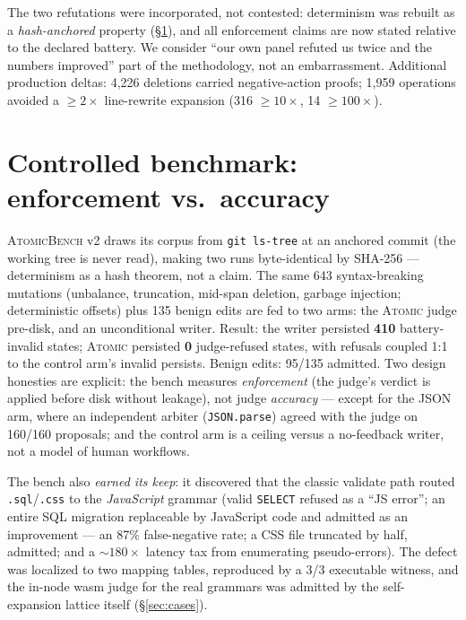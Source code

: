 The two refutations were incorporated, not contested: determinism was rebuilt as
a \emph{hash-anchored} property (\S\ref{sec:bench}), and all enforcement claims
are now stated relative to the declared battery. We consider
``our own panel refuted us twice and the numbers improved'' part of the
methodology, not an embarrassment. Additional production deltas: 4{,}226
deletions carried negative-action proofs; 1{,}959 operations avoided a
$\geq\!2\times$ line-rewrite expansion (316 $\geq\!10\times$, 14
$\geq\!100\times$).

\section{Controlled benchmark: enforcement vs.\ accuracy}\label{sec:bench}

\textsc{AtomicBench} v2 draws its corpus from \texttt{git ls-tree} at an anchored
commit (the working tree is never read), making two runs byte-identical by
SHA-256 --- determinism as a hash theorem, not a claim. The same 643
syntax-breaking mutations (unbalance, truncation, mid-span deletion, garbage
injection; deterministic offsets) plus 135 benign edits are fed to two arms: the
\textsc{Atomic} judge pre-disk, and an unconditional writer. Result: the writer
persisted \textbf{410} battery-invalid states; \textsc{Atomic} persisted
\textbf{0} judge-refused states, with refusals coupled 1:1 to the control arm's
invalid persists. Benign edits: 95/135 admitted. Two design honesties are
explicit: the bench measures \emph{enforcement} (the judge's verdict is applied
before disk without leakage), not judge \emph{accuracy} --- except for the JSON
arm, where an independent arbiter (\texttt{JSON.parse}) agreed with the judge on
160/160 proposals; and the control arm is a ceiling versus a no-feedback writer,
not a model of human workflows.

The bench also \emph{earned its keep}: it discovered that the classic validate
path routed \texttt{.sql}/\texttt{.css} to the \emph{JavaScript} grammar
(valid \texttt{SELECT} refused as a ``JS error''; an entire SQL migration
replaceable by JavaScript code and admitted as an improvement --- an 87\%
false-negative rate; a CSS file truncated by half, admitted; and a
${\sim}180\times$ latency tax from enumerating pseudo-errors). The defect was
localized to two mapping tables, reproduced by a 3/3 executable witness, and the
in-node wasm judge for the real grammars was admitted by the self-expansion
lattice itself (\S\ref{sec:cases}).

